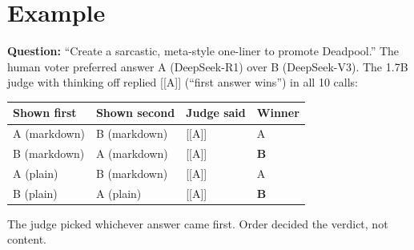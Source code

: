\documentclass[10.5pt]{article}
\begin{document}
\section{Example}
\textbf{Question:} ``Create a sarcastic, meta-style one-liner to promote Deadpool.'' The human voter preferred
answer A (DeepSeek-R1) over B (DeepSeek-V3). The 1.7B judge with thinking off replied [[A]] (``first answer
wins'') in all 10 calls:
\begin{table}[H]
\centering\small
\begin{tabular}{llll}
\toprule
Shown first & Shown second & Judge said & Winner \\
\midrule
A (markdown) & B (markdown) & [[A]] & A \\
B (markdown) & A (markdown) & [[A]] & \textbf{B} \\
A (plain) & B (markdown) & [[A]] & A \\
B (plain) & A (plain) & [[A]] & \textbf{B} \\
\bottomrule
\end{tabular}
\end{table}
The judge picked whichever answer came first. Order decided the verdict, not content.
\end{document}
